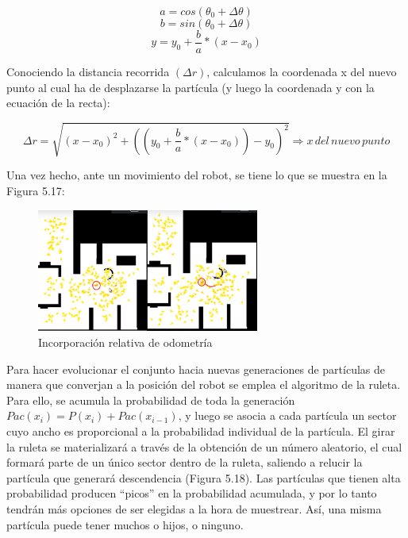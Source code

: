 \begin{equation}
a = cos(\theta_{0} + \Delta\theta)
\end{equation}
\begin{equation}
b = sin(\theta_{0} + \Delta\theta)
\end{equation}
\begin{equation}
y = y_{0} + \dfrac{b}{a} * (x-x_{0})
\end{equation}

Conociendo la distancia recorrida $(\Delta r)$, calculamos la coordenada x del nuevo punto al cual ha de desplazarse la partícula (y luego la coordenada y con la ecuación de la recta):

\begin{equation}
\Delta r = \sqrt{(x-x_{0})^2 + ((y_{0} + \dfrac{b}{a} * (x-x_{0}))-y_{0})^2} \Rightarrow x\, del\, nuevo\, punto
\end{equation}

Una vez hecho, ante un movimiento del robot, se tiene lo que se muestra en la Figura 5.17:

\begin{figure}[H]
\begin{center}
	\includegraphics[width=0.65\textwidth]{figures/movimientoincorporado.png}
	\caption{Incorporación relativa de odometría}
	\label{fig.movimientoincorporado}
	\end{center}
\end{figure}

Para hacer evolucionar el conjunto hacia nuevas generaciones de partículas de manera que converjan a la posición del robot se emplea el algoritmo de la ruleta. Para ello, se acumula la probabilidad de toda la generación $Pac(x_{i}) = P(x_{i})+Pac(x_{i-1})$, y luego se asocia a cada partícula un sector cuyo ancho es proporcional a la probabilidad individual de la partícula. El girar la ruleta se materializará a través de la obtención de un número aleatorio, el cual formará parte de un único sector dentro de la ruleta, saliendo a relucir la partícula que generará descendencia (Figura 5.18). Las partículas que tienen alta probabilidad producen “picos” en la probabilidad acumulada, y por lo tanto tendrán más opciones de ser elegidas a la hora de muestrear. Así, una misma partícula puede tener muchos o hijos, o ninguno.

